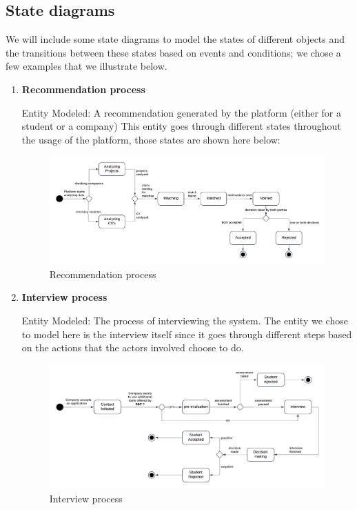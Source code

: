 \subsection{State diagrams}
We will include some state diagrams to model the states of different objects and the transitions between these states based on events and conditions; we chose a few examples that we illustrate below.
\begin{enumerate}

\item \textbf{Recommendation process}

Entity Modeled: A recommendation generated by the platform (either for a student or a company)
This entity goes through different states throughout the usage of the platform, those states are shown here below:


\begin{figure}[H]
    \centering
    \includegraphics[width=1\linewidth]{RASD//Images/recomendation.png}
    \caption{Recommendation process}
    \label{fig:enter-label}
\end{figure}

\pagebreak
\item \textbf{Interview process}

Entity Modeled: The process of interviewing the system.
The entity we chose to model here is the interview itself since it goes through different steps based on the actions that the actors involved choose to do.

\begin{figure}[H]
    \centering
    \includegraphics[width=1\linewidth]{RASD//Images/interview.png}
    \caption{Interview process}
    \label{fig:enter-label}
\end{figure}



\end{enumerate}
